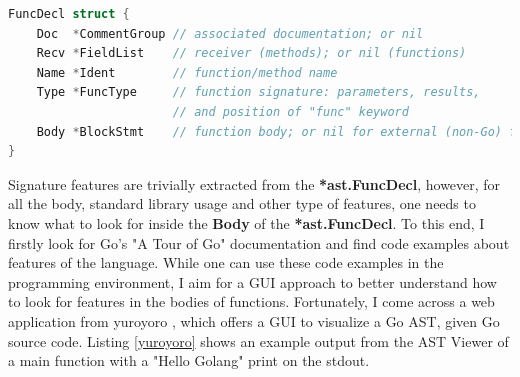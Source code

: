 \documentclass{seal_thesis}
\begin{document}
\begin{lstlisting}[caption=*ast.FuncDecl declaration in Go., label={funcdecl}, language=Go, frame=single]
FuncDecl struct {
	Doc  *CommentGroup // associated documentation; or nil
	Recv *FieldList    // receiver (methods); or nil (functions)
	Name *Ident        // function/method name
	Type *FuncType     // function signature: parameters, results, 
					   // and position of "func" keyword
	Body *BlockStmt    // function body; or nil for external (non-Go) function
}
\end{lstlisting}


\noindent Signature features are trivially extracted from the \textbf{*ast.FuncDecl}, however, for all the body, standard library usage and other type of features, one needs to know what to look for inside the \textbf{Body} of the \textbf{*ast.FuncDecl}. To this end, I firstly look for Go's "A Tour of Go" documentation \cite{atourofgo} and find code examples about features of the language. While one can use these code examples in the programming environment, I aim for a GUI approach to better understand how to look for features in the bodies of functions. Fortunately, I come across a web application from yuroyoro \cite{goastviewer}, which offers a GUI to visualize a Go AST, given Go source code. Listing \ref{yuroyoro} shows an example output from the AST Viewer of a main function with a "Hello Golang" print on the stdout.
\end{document}
